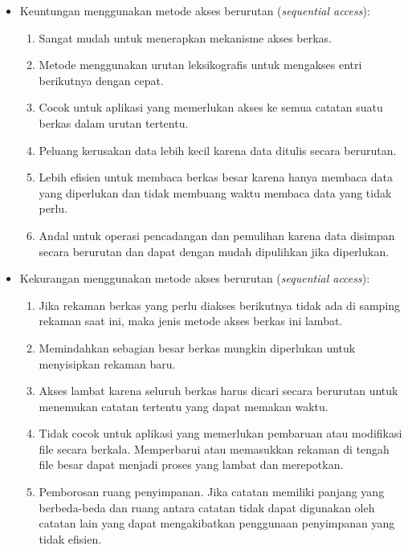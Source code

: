 \documentclass[12pt]{article}
\begin{document}
\begin{itemize}
\begin{itemize}
            \item Keuntungan menggunakan metode akses berurutan (\textit{sequential access}):
            \begin{enumerate}
                \item Sangat mudah untuk menerapkan mekanisme akses berkas.
                \item Metode menggunakan urutan leksikografis untuk mengakses entri berikutnya dengan cepat.
                \item Cocok untuk aplikasi yang memerlukan akses ke semua catatan suatu berkas dalam urutan tertentu.
                \item Peluang kerusakan data lebih kecil karena data ditulis secara berurutan.
                \item Lebih efisien untuk membaca berkas besar karena hanya membaca data yang diperlukan dan tidak membuang waktu membaca data yang tidak perlu.
                \item Andal untuk operasi pencadangan dan pemulihan karena data disimpan secara berurutan dan dapat dengan mudah dipulihkan jika diperlukan.
            \end{enumerate}
            \item Kekurangan menggunakan metode akses berurutan (\textit{sequential access}):
            \begin{enumerate}
                \item Jika rekaman berkas yang perlu diakses berikutnya tidak ada di samping rekaman saat ini, maka jenis metode akses berkas ini lambat.
                \item Memindahkan sebagian besar berkas mungkin diperlukan untuk menyisipkan rekaman baru.
                \item Akses lambat karena seluruh berkas harus dicari secara berurutan untuk menemukan catatan tertentu yang dapat memakan waktu.
                \item Tidak cocok untuk aplikasi yang memerlukan pembaruan atau modifikasi file secara berkala. Memperbarui atau memasukkan rekaman di tengah file besar dapat menjadi proses yang lambat dan merepotkan.
                \item Pemborosan ruang penyimpanan. Jika catatan memiliki panjang yang berbeda-beda dan ruang antara catatan tidak dapat digunakan oleh catatan lain yang dapat mengakibatkan penggunaan penyimpanan yang tidak efisien.
            \end{enumerate}
        \end{itemize}

\end{itemize}
\end{document}
